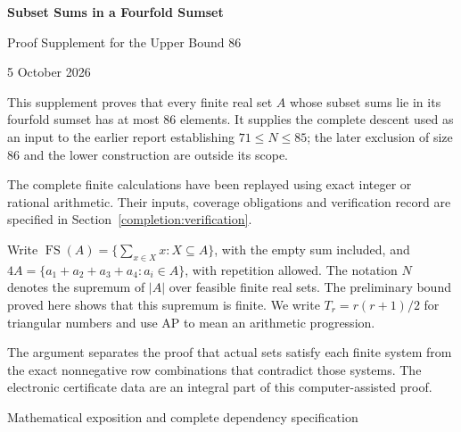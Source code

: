\documentclass[11pt,a4paper]{article}
\theoremstyle{remark}
\newcommand{\FS}{\operatorname{FS}}
\begin{document}
\begin{titlepage}
\centering
\vspace*{1.9cm}
{\LARGE\bfseries Subset Sums in a Fourfold Sumset\par}
\vspace{0.7cm}
{\Large Proof Supplement for the Upper Bound 86\par}
\vspace{0.6cm}
{\large 5 October 2026\par}
\vspace{1.8cm}
\begin{minipage}{0.86\textwidth}
\setlength{\parskip}{0.6em}\setlength{\parindent}{0pt}


This supplement proves that every finite real set $A$ whose subset
sums lie in its fourfold sumset has at most $86$ elements. It supplies the
complete descent used as an input to the earlier report establishing
$71\le N\le85$; the later exclusion of size $86$ and the lower
construction are outside its scope.

The complete finite calculations have been replayed using exact
integer or rational arithmetic. Their inputs, coverage obligations and
verification record are specified in Section~\ref{completion:verification}.

Write $\FS(A)=\{\sum_{x\in X}x:X\subseteq A\}$, with the empty sum
included, and $4A=\{a_1+a_2+a_3+a_4:a_i\in A\}$, with repetition allowed.
The notation $N$ denotes the supremum of $|A|$ over feasible finite real
sets. The preliminary bound proved here shows that this supremum is finite.
We write $T_r=r(r+1)/2$ for triangular numbers and use AP to mean
an arithmetic progression.

The argument separates the proof that actual sets satisfy each finite
system from the exact nonnegative row combinations that contradict those
systems. The electronic certificate data are an integral part of this
computer-assisted proof.
\end{minipage}
\vfill
{\small Mathematical exposition and complete dependency specification\par}
\end{titlepage}
\tableofcontents
\clearpage
\end{document}
